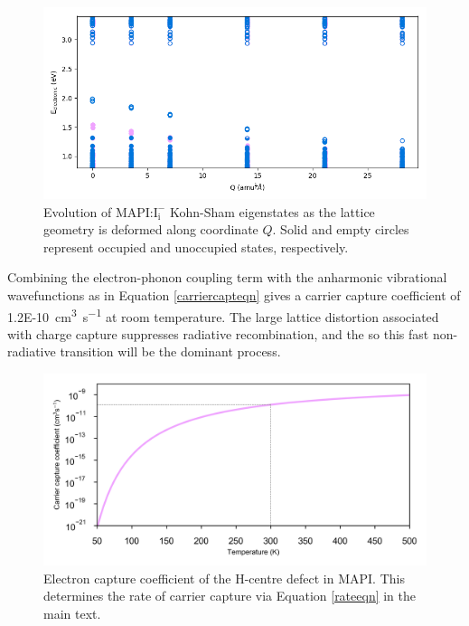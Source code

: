 \begin{figure}[h!]   
\centering
  \includegraphics[width=1.0\columnwidth]{figures/ch6/eigs.png}
  \caption[Evolution of $\mathrm{I}_\mathrm{i}$ Kohn-Sham eigenstates]{Evolution of MAPI:$\mathrm{I}_\mathrm{i}^-$ Kohn-Sham eigenstates as the lattice geometry is deformed along coordinate $Q$.  Solid and empty circles represent occupied and unoccupied states, respectively.}
\label{eigenvalues}
\end{figure}

Combining the electron-phonon coupling term with the anharmonic vibrational wavefunctions as in Equation \ref{carriercapteqn} gives a carrier capture coefficient of \SI{1.2E-10}{\centi\metre\cubed\per\second} at room temperature.
The large lattice distortion associated with charge capture suppresses radiative recombination, and the so this fast non-radiative transition will be the dominant process.

\begin{figure}[h!]   
\centering
  \includegraphics[width=1.0\columnwidth]{figures/ch6/carrier_capture_rate.png}
  \caption[H-centre electron capture coefficient]{Electron capture coefficient of the H-centre defect in MAPI. This determines the rate of carrier capture via Equation \ref{rateeqn} in the main text.}
\label{carrier_capture_rate}
\end{figure}

